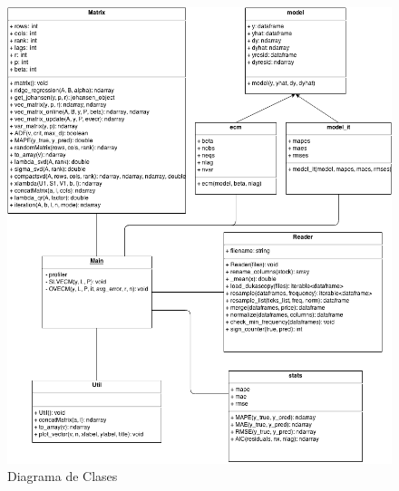 \begin{figure}[h!t]
    \begin{center}
        \includegraphics[width=1\textwidth]{images/class_diagram.png}
        \caption{Diagrama de Clases}
        \label{fig:class_diagram}
    \end{center}
\end{figure}

